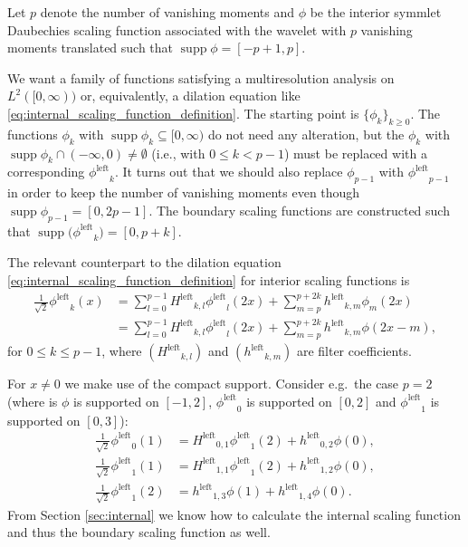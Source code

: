 \documentclass[a4paper]{scrartcl}
\newcommand\lphi{\ensuremath{\phi^{\text{left}}}}
\newcommand\lH{\ensuremath{H^{\text{left}}}}
\newcommand\lh{\ensuremath{h^{\text{left}}}}
\DeclareMathOperator\supp{supp}
\begin{document}
Let $p$ denote the number of vanishing moments and $\phi$ be the interior symmlet Daubechies scaling function associated with the wavelet with $p$ vanishing moments translated such that $\supp\phi = [-p+1, p]$.

We want a family of functions satisfying a multiresolution analysis on $L^2([0,\infty))$ or, equivalently, a dilation equation like \cref{eq:internal_scaling_function_definition}.
The starting point is $\{\phi_k\}_{k\geq 0}$.
The functions $\phi_k$ with $\supp\phi_k \subseteq [0,\infty)$ do not need any alteration, but the $\phi_k$ with $\supp\phi_k \cap (-\infty,0) \neq \emptyset$ (i.e., with $0\leq k < p-1$) must be replaced with a corresponding $\lphi_k$.
It turns out that we should also replace $\phi_{p-1}$ with $\lphi_{p-1}$ in order to keep the number of vanishing moments even though $\supp\phi_{p-1} = [0,2p-1]$.
The boundary scaling functions are constructed such that $\supp\bigl(\lphi_k\bigr) = [0,p+k]$.

The relevant counterpart to the dilation equation \cref{eq:internal_scaling_function_definition} for interior scaling functions is
\begin{align}
	\frac1{\sqrt2} \lphi_k(x)
	& = \sum_{l=0}^{p-1} \lH_{k,l} \lphi_l(2x) + \sum_{m=p}^{p+2k} \lh_{k,m} \phi_m(2x)
	\nonumber
	\\
	& = \sum_{l=0}^{p-1} \lH_{k,l} \lphi_l(2x) + \sum_{m=p}^{p+2k} \lh_{k,m} \phi(2x-m),
	\label{eq:left_scaling_function_definition}
\end{align}
for $0\leq k\leq p-1$, where $(\lH_{k,l})$ and $(\lh_{k,m})$ are filter coefficients.

For $x \neq 0$ we make use of the compact support.
Consider e.g.\ the case $p=2$ (where is $\phi$ is supported on $[-1,2]$, $\lphi_0$ is supported on $[0,2]$ and $\lphi_1$ is supported on $[0,3]$):
\begin{align*}
	\frac1{\sqrt2} \lphi_0(1)
	& = \lH_{0,1} \lphi_1(2) + \lh_{0,2} \phi(0),
	\\
	\frac1{\sqrt2} \lphi_1(1)
	& = \lH_{1,1} \lphi_1(2) + \lh_{1,2} \phi(0),
	\\
	\frac1{\sqrt2} \lphi_1(2)
	& = \lh_{1,3} \phi(1) + \lh_{1,4} \phi(0).
\end{align*}
From Section \ref{sec:internal} we know how to calculate the internal scaling function and thus the boundary scaling function as well.
\end{document}
